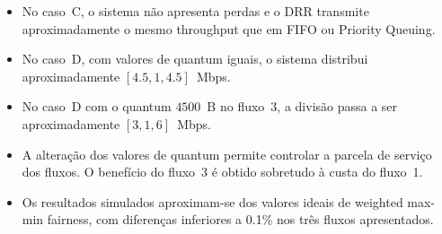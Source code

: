 \documentclass[11pt,a4paper]{article}
\begin{document}
\begin{itemize}
    \item No caso~C, o sistema não apresenta perdas e o DRR transmite
    aproximadamente o mesmo throughput que em FIFO ou Priority Queuing.
    \item No caso~D, com valores de quantum iguais, o sistema distribui aproximadamente
    $[4.5,1,4.5]$~Mbps.
    \item No caso~D com o quantum $4500$~B no fluxo~3, a divisão passa a ser
    aproximadamente $[3,1,6]$~Mbps.
    \item A alteração dos valores de quantum permite controlar a parcela de serviço dos
    fluxos. O benefício do fluxo~3 é obtido sobretudo à custa do fluxo~1.
    \item Os resultados simulados aproximam-se dos valores ideais de
    weighted max-min fairness, com diferenças inferiores a 0.1\% nos três
    fluxos apresentados.
\end{itemize}
\end{document}
